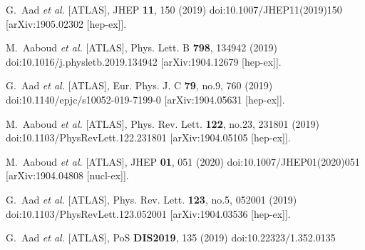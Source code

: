 \begin{thebibliography}{9}
G.~Aad \textit{et al.} [ATLAS],
JHEP \textbf{11}, 150 (2019)
doi:10.1007/JHEP11(2019)150
[arXiv:1905.02302 [hep-ex]].

M.~Aaboud \textit{et al.} [ATLAS],
Phys. Lett. B \textbf{798}, 134942 (2019)
doi:10.1016/j.physletb.2019.134942
[arXiv:1904.12679 [hep-ex]].

G.~Aad \textit{et al.} [ATLAS],
Eur. Phys. J. C \textbf{79}, no.9, 760 (2019)
doi:10.1140/epjc/s10052-019-7199-0
[arXiv:1904.05631 [hep-ex]].

M.~Aaboud \textit{et al.} [ATLAS],
Phys. Rev. Lett. \textbf{122}, no.23, 231801 (2019)
doi:10.1103/PhysRevLett.122.231801
[arXiv:1904.05105 [hep-ex]].

M.~Aaboud \textit{et al.} [ATLAS],
JHEP \textbf{01}, 051 (2020)
doi:10.1007/JHEP01(2020)051
[arXiv:1904.04808 [nucl-ex]].

G.~Aad \textit{et al.} [ATLAS],
Phys. Rev. Lett. \textbf{123}, no.5, 052001 (2019)
doi:10.1103/PhysRevLett.123.052001
[arXiv:1904.03536 [hep-ex]].

G.~Aad \textit{et al.} [ATLAS],
PoS \textbf{DIS2019}, 135 (2019)
doi:10.22323/1.352.0135


\end{thebibliography}
